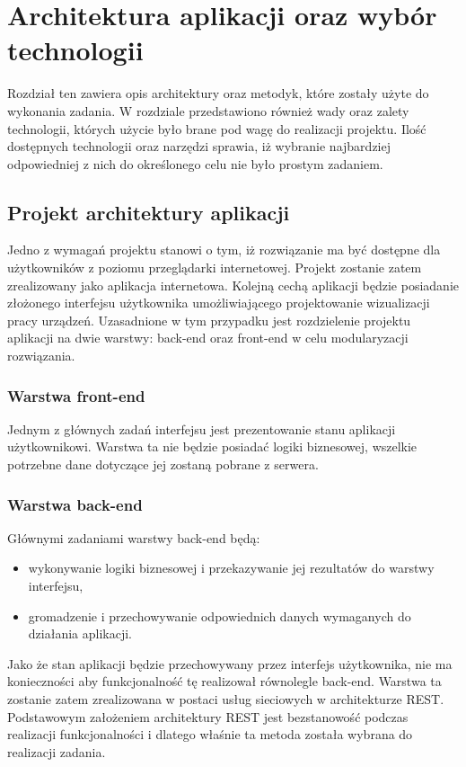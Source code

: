 \chapter{Architektura aplikacji oraz wybór technologii}

Rozdział ten zawiera opis architektury oraz metodyk, które zostały użyte do wykonania zadania. W rozdziale przedstawiono również wady oraz zalety technologii, których użycie było brane pod wagę do realizacji projektu. Ilość dostępnych technologii oraz narzędzi sprawia, iż wybranie najbardziej odpowiedniej z nich do określonego celu nie było prostym zadaniem.

\section{Projekt architektury aplikacji}
Jedno z wymagań projektu stanowi o tym, iż rozwiązanie ma być dostępne dla użytkowników z poziomu przeglądarki internetowej. Projekt zostanie zatem zrealizowany jako aplikacja internetowa. Kolejną cechą aplikacji będzie posiadanie złożonego interfejsu użytkownika umożliwiającego projektowanie wizualizacji pracy urządzeń. Uzasadnione w tym przypadku jest rozdzielenie projektu aplikacji na dwie warstwy: back-end oraz front-end w celu modularyzacji rozwiązania. 

\subsection{Warstwa front-end}
Jednym z głównych zadań interfejsu jest prezentowanie stanu aplikacji użytkownikowi. Warstwa ta nie będzie posiadać logiki biznesowej, wszelkie potrzebne dane dotyczące jej zostaną pobrane z serwera.

\subsection{Warstwa back-end}
Głównymi zadaniami warstwy back-end będą:
\begin{itemize}
\item wykonywanie logiki biznesowej i przekazywanie jej rezultatów do warstwy interfejsu,
\item gromadzenie i przechowywanie odpowiednich danych wymaganych do działania aplikacji.
\end{itemize}

Jako że stan aplikacji będzie przechowywany przez interfejs użytkownika, nie ma konieczności aby funkcjonalność tę realizował równolegle back-end. Warstwa ta zostanie zatem zrealizowana w postaci usług sieciowych w architekturze REST. Podstawowym założeniem architektury REST jest bezstanowość podczas realizacji funkcjonalności\cite{rest-book} i dlatego właśnie ta metoda została wybrana do realizacji zadania.

